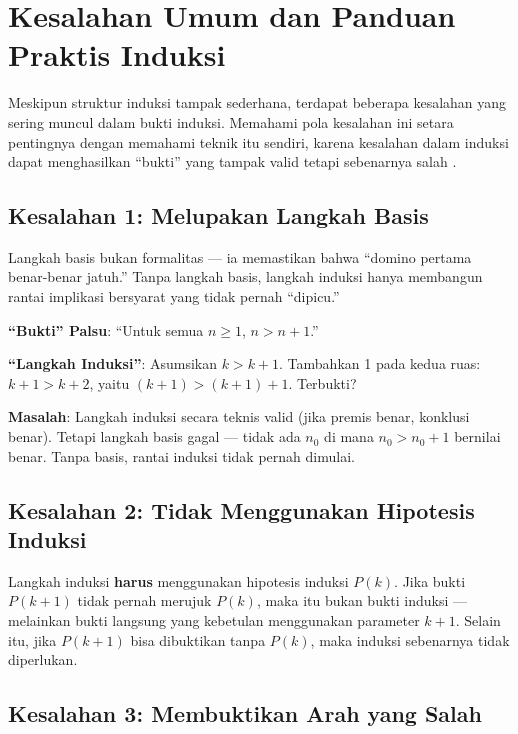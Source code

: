 \section{Kesalahan Umum dan Panduan Praktis Induksi}

Meskipun struktur induksi tampak sederhana, terdapat beberapa kesalahan yang sering muncul dalam bukti induksi. Memahami pola kesalahan ini setara pentingnya dengan memahami teknik itu sendiri, karena kesalahan dalam induksi dapat menghasilkan ``bukti'' yang tampak valid tetapi sebenarnya salah \cite{hammack2018}.

\subsection{Kesalahan 1: Melupakan Langkah Basis}

Langkah basis bukan formalitas --- ia memastikan bahwa ``domino pertama benar-benar jatuh.'' Tanpa langkah basis, langkah induksi hanya membangun rantai implikasi bersyarat yang tidak pernah ``dipicu.''

\begin{contoh}
\textbf{``Bukti'' Palsu}: ``Untuk semua $n \geq 1$, $n > n + 1$.''

\textbf{``Langkah Induksi''}: Asumsikan $k > k + 1$. Tambahkan 1 pada kedua ruas: $k + 1 > k + 2$, yaitu $(k+1) > (k+1) + 1$. Terbukti?

\textbf{Masalah}: Langkah induksi secara teknis valid (jika premis benar, konklusi benar). Tetapi langkah basis gagal --- tidak ada $n_0$ di mana $n_0 > n_0 + 1$ bernilai benar. Tanpa basis, rantai induksi tidak pernah dimulai.
\end{contoh}

\subsection{Kesalahan 2: Tidak Menggunakan Hipotesis Induksi}

Langkah induksi \textbf{harus} menggunakan hipotesis induksi $P(k)$. Jika bukti $P(k+1)$ tidak pernah merujuk $P(k)$, maka itu bukan bukti induksi --- melainkan bukti langsung yang kebetulan menggunakan parameter $k+1$. Selain itu, jika $P(k+1)$ bisa dibuktikan tanpa $P(k)$, maka induksi sebenarnya tidak diperlukan.

\subsection{Kesalahan 3: Membuktikan Arah yang Salah}


